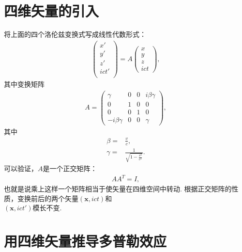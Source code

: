 \documentclass{assignment}
\begin{document}
\section{四维矢量的引入}
将上面的四个洛伦兹变换式写成线性代数形式：
\begin{align}
    \left(\begin{matrix}
        x'\\
        y'\\
        z'\\
        ict'\\
    \end{matrix}\right)=A\left(\begin{matrix}
        x\\
        y\\
        z\\
        ict
    \end{matrix}\right),
\end{align}
其中变换矩阵
\begin{align}
    A=\left(\begin{matrix}
        \gamma&0&0&i\beta\gamma\\
        0&1&0&0\\
        0&0&1&0\\
        -i\beta\gamma&0&0&\gamma
    \end{matrix}\right),
\end{align}
其中
\begin{align}
    \beta=&\frac{v}{c},\\
    \gamma=&\frac{1}{\sqrt{1-\frac{v^2}{c^2}}}.
\end{align}
可以验证，$A$是一个正交矩阵：
\begin{align}
    AA^T=I,
\end{align}
也就是说乘上这样一个矩阵相当于使矢量在四维空间中转动. 根据正交矩阵的性质，变换前后的两个矢量$(\bm{x},ict)$和\\$(\bm{x},ict')$模长不变.

\section{用四维矢量推导多普勒效应}
\end{document}

